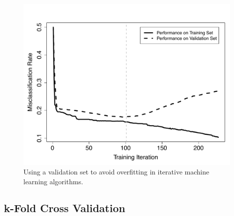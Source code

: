 \documentclass[xcolor={table}]{beamer}
\begin{document}
 \begin{frame} 
\begin{figure}[htb]
       \begin{centering}
			\includegraphics[width=0.54\linewidth]{images/InformationBased-ChurnIterationPlotRevised.pdf}
       \caption{Using a validation set to avoid overfitting in iterative machine learning algorithms.}
       \label{fig:avoidOverfittingTrainVValidn}
       \end{centering}
\end{figure}
\end{frame} 

\subsection{k-Fold Cross Validation}
\end{document}
